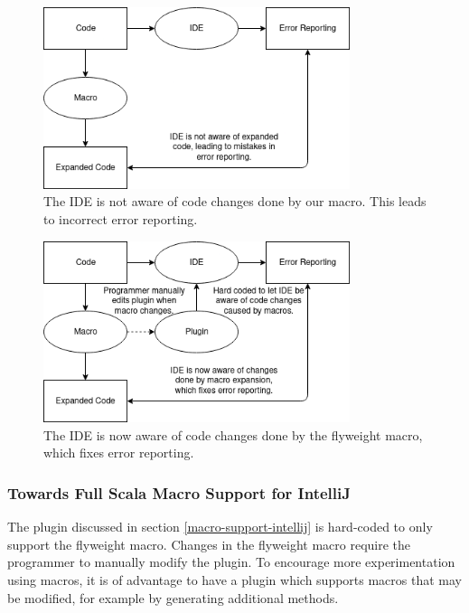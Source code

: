 \documentclass[11pt]{article}
\begin{document}
    \begin{figure}[H]
        \begin{center}
            \includegraphics[width=0.8\textwidth]{ide-problem.png}
            \caption{The IDE is not aware of code changes done by our macro. This leads to incorrect error reporting.}
            \label{fig:ide-problem}
        \end{center}   
    \end{figure}

    \begin{figure}[H]
        \begin{center}
            \includegraphics[width=0.8\textwidth]{ide-fixed.png}
            \caption{The IDE is now aware of code changes done by the flyweight macro, which fixes error reporting.}
            \label{fig:ide-fixed}
        \end{center}   
    \end{figure}

    \subsubsection{Towards Full Scala Macro Support for IntelliJ} \label{full-scala-macro-support}

    The plugin discussed in section \ref{macro-support-intellij} is hard-coded to only support the flyweight macro.
    Changes in the flyweight macro require the programmer to manually modify
    the plugin.
    To encourage more experimentation using macros, it is of advantage
    to have a plugin which supports macros that may be modified, for example
    by generating additional methods.
\end{document}
